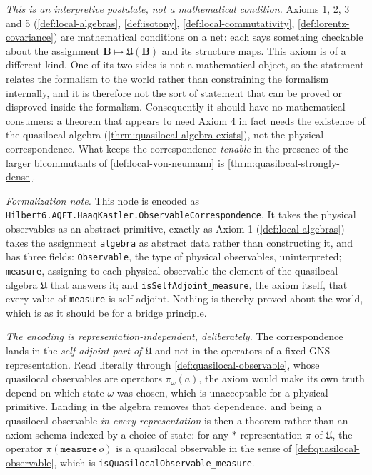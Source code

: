 \begin{definition}
    \emph{This is an interpretive postulate, not a mathematical condition.} Axioms 1, 2, 3 and 5 (\ref{def:local-algebras}, \ref{def:isotony}, \ref{def:local-commutativity}, \ref{def:lorentz-covariance}) are mathematical conditions on a net: each says something checkable about the assignment $\mathbf{B} \mapsto \mathfrak{U}(\mathbf{B})$ and its structure maps. This axiom is of a different kind. One of its two sides is not a mathematical object, so the statement relates the formalism to the world rather than constraining the formalism internally, and it is therefore not the sort of statement that can be proved or disproved inside the formalism. Consequently it should have no mathematical consumers: a theorem that appears to need Axiom 4 in fact needs the existence of the quasilocal algebra (\ref{thrm:quasilocal-algebra-exists}), not the physical correspondence. What keeps the correspondence \emph{tenable} in the presence of the larger bicommutants of \ref{def:local-von-neumann} is \ref{thrm:quasilocal-strongly-dense}.

    \emph{Formalization note.} This node is encoded as \texttt{Hilbert6.AQFT.HaagKastler.ObservableCorrespondence}. It takes the physical observables as an abstract primitive, exactly as Axiom 1 (\ref{def:local-algebras}) takes the assignment \texttt{algebra} as abstract data rather than constructing it, and has three fields: \texttt{Observable}, the type of physical observables, uninterpreted; \texttt{measure}, assigning to each physical observable the element of the quasilocal algebra $\mathfrak{U}$ that answers it; and \texttt{isSelfAdjoint\_measure}, the axiom itself, that every value of \texttt{measure} is self-adjoint. Nothing is thereby proved about the world, which is as it should be for a bridge principle.

    \emph{The encoding is representation-independent, deliberately.} The correspondence lands in the \emph{self-adjoint part of $\mathfrak{U}$} and not in the operators of a fixed GNS representation. Read literally through \ref{def:quasilocal-observable}, whose quasilocal observables are operators $\pi_\omega(a)$, the axiom would make its own truth depend on which state $\omega$ was chosen, which is unacceptable for a physical primitive. Landing in the algebra removes that dependence, and being a quasilocal observable \emph{in every representation} is then a theorem rather than an axiom schema indexed by a choice of state: for any $*$-representation $\pi$ of $\mathfrak{U}$, the operator $\pi(\texttt{measure}\,o)$ is a quasilocal observable in the sense of \ref{def:quasilocal-observable}, which is \texttt{isQuasilocalObservable\_measure}.


\end{definition}
